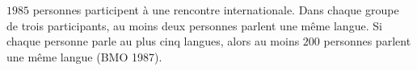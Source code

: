 $1985$ personnes participent à une rencontre internationale. Dans chaque groupe de trois participants, au moins deux personnes parlent une même langue. Si chaque personne parle au plus cinq langues, alors au moins $200$ personnes parlent une même langue (BMO 1987).
